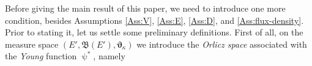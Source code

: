 \documentclass[11pt,reqno]{amsart}
\numberwithin{equation}{section}
\newcommand{\Lip}{\mathrm{Lip}}
\newcommand{\dnabla}{\overline\nabla}
\newcommand{\dd}{\mathrm{d}}
\theoremstyle{definition}
\newtheorem{assumption}[theorem]{Assumption}
\def\dd{\mathrm{d}}
\newcommand{\Bb}{\mathrm{B}_{\mathrm b}}
\newcommand{\teta}{\boldsymbol \vartheta}
\newcommand{\tetapi}{\boldsymbol{\teta}_{\kappa}}
\newcommand{\Ed}{{E'}}
\newcommand{\rmL}{\mathrm{L}}
\newcommand{\RCR}{\color{magenta}}
\newcommand{\TODOR}[1]{\todo[inline, color=magenta!20]{#1}}
\newcommand{\TODO}[1]{\todo[inline, color=cyan!20]{#1}}
\newcommand{\EEE}{\color{black}}
\numberwithin{equation}{section}
\begin{document}
\par
 Before giving the main result of this paper,  we need to introduce one more condition, besides  Assumptions  \ref{Ass:V},  \ref{Ass:E},  \ref{Ass:D}, and \ref{Ass:flux-density}. 
 \RCR Prior to stating it, let us settle some preliminary definitions.
% 
 \noindent 
 \RCR 
  First of all, on the measure space 
  $(
 \Ed, \mathfrak{B}(\Ed), \tetapi  )$
  we introduce the \emph{Orlicz space}    associated with the \emph{Young} function $\uppsi^*$, namely
\end{document}
